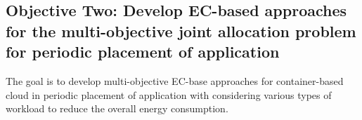 \subsection{Objective Two: Develop EC-based approaches for the multi-objective joint allocation problem for periodic placement of application}
The goal is to develop multi-objective EC-base approaches for container-based cloud in periodic placement of application with considering various types of workload to reduce the overall energy consumption.



